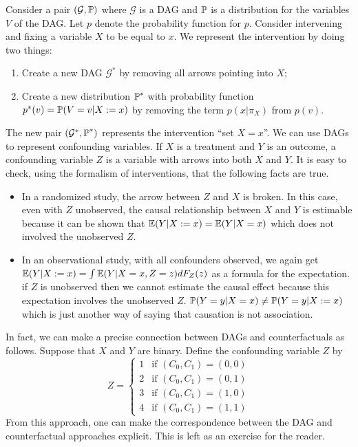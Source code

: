 Consider a pair \((\mathcal{G}, \operatorname{\mathbb{P}})\) where \(\mathcal{G}\) is a
DAG and \(\operatorname{\mathbb{P}}\) is a distribution for the variables \(V\) of the
DAG. Let \(p\) denote the probability function for \(p\). Consider
intervening and fixing a variable \(X\) to be equal to \(x\). We
represent the intervention by doing two things:
\begin{enumerate}[tightlist,label={\arabic*.}]
\item
  Create a new DAG \(\mathcal{G}^{*}\) by removing all arrows pointing
  into \(X\);
\item
  Create a new distribution \(\operatorname{\mathbb{P}}^{*}\) with probability function
  \(p^{*}(v) = \operatorname{\mathbb{P}}(V = v | X := x)\) by removing the term
  \(p(x | \pi_X)\) from \(p(v)\).
\end{enumerate}
The new pair \((\mathcal{G}^{*}, \operatorname{\mathbb{P}}^{*})\) represents the
intervention ``set \(X = x\)''.
We can use DAGs to represent confounding variables. If \(X\) is a
treatment and \(Y\) is an outcome, a confounding variable \(Z\) is a
variable with arrows into both \(X\) and \(Y\). It is easy to check,
using the formalism of interventions, that the following facts are true.
\begin{itemize}[tightlist]
\item
  In a randomized study, the arrow between \(Z\) and \(X\) is broken. In
  this case, even with \(Z\) unobserved, the causal relationship between
  \(X\) and \(Y\) is estimable because it can be shown that
  \(\operatorname{\mathbb{E}}(Y | X := x) = \operatorname{\mathbb{E}}(Y | X = x)\) which does not
  involved the unobserved \(Z\).\\
\item
  In an observational study, with all confounders observed, we again get
  \(\operatorname{\mathbb{E}}(Y | X := x) = \int \operatorname{\mathbb{E}}(Y | X = x, Z = z) d F_Z(z)\)
  as a formula for the expectation. if \(Z\) is unobserved then we
  cannot estimate the causal effect because this expectation involves
  the unobserved \(Z\).
  \(\operatorname{\mathbb{P}}(Y = y | X = x) \neq \operatorname{\mathbb{P}}(Y = y | X := x)\) which is
  just another way of saying that causation is not association.
\end{itemize}
In fact, we can make a precise connection between DAGs and
counterfactuals as follows. Suppose that \(X\) and \(Y\) are binary.
Define the confounding variable \(Z\) by
\[
Z = \begin{cases}
1 & \text{if } (C_{0}, C_{1}) = (0, 0) \\
2 & \text{if } (C_{0}, C_{1}) = (0, 1) \\
3 & \text{if } (C_{0}, C_{1}) = (1, 0) \\
4 & \text{if } (C_{0}, C_{1}) = (1, 1)
\end{cases}
\]
From this approach, one can make the correspondence between the DAG and
counterfactual approaches explicit. This is left as an exercise for the
reader.

